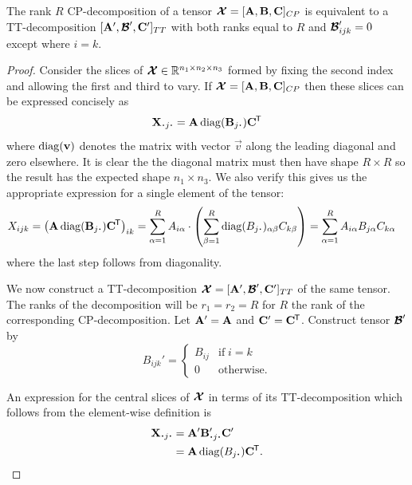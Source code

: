 \begin{prop}
The rank \(R\) CP-decomposition of a tensor \(\bm{\mathcal{X}} = [\mathbf{A},\mathbf{B},\mathbf{C}]_{CP}\) is
equivalent to a TT-decomposition \([\mathbf{A}', \bm{\mathcal{B}}', \mathbf{C}']_{TT}\) with both ranks
equal to \(R\) and \(\bm{\mathcal{B}}'_{ijk} = 0\) except where \(i=k\).
\end{prop}
\begin{proof}
Consider the slices of \(\bm{\mathcal{X}} \in \mathbb{R}^{n_1 \times n_2 \times n_3}\) formed by fixing the
second index and allowing the first and third to vary. If 
\(\bm{\mathcal{X}} = [\mathbf{A}, \mathbf{B}, \mathbf{C}]_{CP}\) then these slices can be expressed concisely as
\begin{equation} \label{eq:cp-slice}
	\mat{X}_{\midbullet j \midbullet} = \mat{A}\diag({\mat{B}_{j\midbullet}})\tran{\mat{C}}
\end{equation} where \(\operatorname{diag}(\mathbf{v})\) denotes the matrix with vector \(\vec{v}\) along the
leading diagonal and zero elsewhere. 
It is clear the the diagonal matrix must then have shape
\(R \times R\) so the result has the expected shape \(n_1 \times n_3\). We also verify this gives us
the appropriate expression for a single element of the tensor:
\begin{align}
	X_{ijk} &= \left(\mat{A}\diag({\mat{B}_{j\midbullet}})\tran{\mat{C}}\right)_{ik} 
		    = \sum_{\alpha=1}^R A_{i\alpha} \cdot
		    	\left(\sum_{\beta=1}^{R} \diag(B_{j\midbullet})_{\alpha\beta} C_{k\beta}\right) 
			= \sum_{\alpha=1}^R A_{i\alpha} B_{j\alpha} C_{k\alpha}
\end{align} where the last step follows from diagonality.

We now construct a TT-decomposition \(\bm{\mathcal{X}} = [\mathbf{A}', \bm{\mathcal{B}}', \mathbf{C}']_{TT}\)
of the same tensor. The ranks of the decomposition will be \(r_1 = r_2 = R\) for \(R\) the rank
of the corresponding CP-decomposition.
Let \(\mathbf{A}' = \mathbf{A}\) and \(\mathbf{C}' = \mathbf{C}^{\mkern-1.5mu\mathsf{T}}\). Construct tensor \(\bm{\mathcal{B}}'\)
by
\begin{equation}
	B_{ijk}' = \begin{cases}
		B_{ij} & \text{if}\; i = k \\
		0    & \text{otherwise}.
	\end{cases}
\end{equation}

An expression for the central slices of \(\bm{\mathcal{X}}\) in terms of its TT-decomposition which
follows from the element-wise definition is
\begin{align}
	\mat{X}_{\midbullet j \midbullet} &= \mat{A}'\mat{B}_{\midbullet j \midbullet}'\mat{C}'\\
	&= \mat{A}\diag(B_{j\midbullet})\tran{\mat{C}}.
\end{align}
\end{proof}

